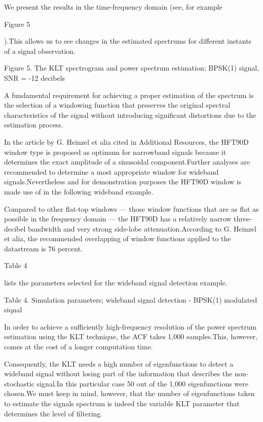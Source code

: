\documentclass[12pt]{report}
\begin{document}
We present the results in the time-frequency domain (see, for example \begin{normalsize}\color{red}Figure 5\end{normalsize}).\@ This allows us to see changes in the estimated spectrums for different instants of a signal observation.
\begin{center}
	\color{blue}Figure 5. The KLT spectrogram and power spectrum estimation; BPSK(1) signal, SNR = -12 decibels
\end{center}

A fundamental requirement for achieving a proper estimation of the spectrum is the selection of a windowing function that preserves the original spectral characteristics of the signal without introducing significant distortions due to the estimation process.

In the article by G. Heinzel et alia cited in Additional Resources, the HFT90D window type is proposed as optimum for narrowband signals because it determines the exact amplitude of a sinusoidal component.\@ Further analyses are recommended to determine a most appropriate window for wideband signals.\@ Nevertheless and for demonstration purposes the HFT90D window is made use of in the following wideband example.

Compared to other flat-top windows — those window functions that are as flat as possible in the frequency domain — the HFT90D has a relatively narrow three-decibel bandwidth and very strong side-lobe attenuation.\@ According to G. Heinzel et alia, the recommended overlapping of window functions applied to the datastream is 76 percent.\ \begin{normalsize}\color{red}Table 4\end{normalsize} lists the parameters selected for the wideband signal detection example.
\begin{center}
	\color{blue}Table 4. Simulation parameters; wideband signal detection - BPSK(1) modulated
	siqnal
\end{center}
In order to achieve a sufficiently high-frequency resolution of the power spectrum estimation using the KLT technique, the ACF takes 1,000 samples.\@ This, however, comes at the cost of a longer computation time.

Consequently, the KLT needs a high number of eigenfunctions to detect a wideband signal without losing part of the information that describes the non-stochastic signal.\@ In this particular case 50 out of the 1,000 eigenfunctions were chosen.\@ We must keep in mind, however, that the number of eigenfunctions taken to estimate the signals spectrum is indeed the variable KLT parameter that determines the level of filtering.
\end{document}

